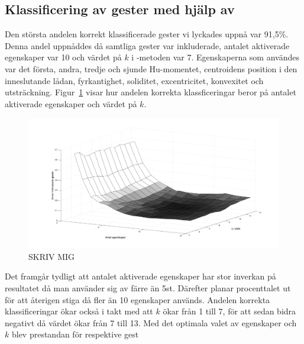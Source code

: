 \documentclass[../rapport_MVEX01-11-05]{subfiles}
\begin{document}
\subsection{Klassificering av gester med hjälp av \knn}
Den största andelen korrekt klassificerade gester vi lyckades uppnå var 91,5\%.
Denna andel uppnåddes då samtliga gester var inkluderade, antalet aktiverade
egenskaper var 10 och värdet på $k$ i \knn-metoden var 7. Egenskaperna som
användes var det första, andra, tredje och sjunde Hu-momentet, centroidens
position i den inneslutande lådan, fyrkantighet, soliditet, excentricitet,
konvexitet och utsträckning. Figur~\ref{fig:knn-optimering} visar hur andelen korrekta
klassficeringar beror på antalet aktiverade egenskaper och värdet på $k$.

\begin{figure}[tb]
    \begin{center}
        \includegraphics[trim=2cm 2cm 2cm 2cm, width=\columnwidth]{bilder/knn_optimering}
    \end{center}
    \caption{SKRIV MIG}
    \label{fig:knn-optimering}
\end{figure}

Det framgår tydligt att antalet aktiverade egenskaper har stor
inverkan på resultatet då man använder sig av färre än
5st. Därefter planar procenttalet ut för att återigen stiga då
fler än 10 egenskaper används. Andelen korrekta klassificeringar
ökar också i takt med att $k$ ökar från 1 till 7, för att sedan
bidra negativt då värdet ökar från 7 till 13. Med det optimala
valet av egenskaper och $k$ blev prestandan för respektive gest


\end{document}
